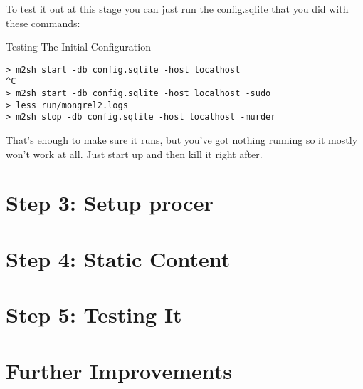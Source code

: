 To test it out at this stage you can just run the config.sqlite that you
did with these commands:

\begin{code}{Testing The Initial Configuration}
\begin{Verbatim}
> m2sh start -db config.sqlite -host localhost
^C
> m2sh start -db config.sqlite -host localhost -sudo
> less run/mongrel2.logs
> m2sh stop -db config.sqlite -host localhost -murder
\end{Verbatim}
\end{code}

That's enough to make sure it runs, but you've got nothing running
so it mostly won't work at all.  Just start up and then kill it
right after.


\section{Step 3: Setup procer}



\section{Step 4: Static Content}

\section{Step 5: Testing It}


\section{Further Improvements}



